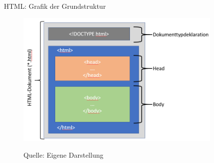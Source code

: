 \documentclass[xcolor=dvipsnames]{beamer}\usepackage[]{graphicx}\usepackage[]{color}
\begin{document}
\begin{frame}{HTML: Grafik der Grundstruktur }
  \begin{figure}
  	\centering
  	\includegraphics[width=0.9\textwidth]{figure/htmlbasicstructure.png}
  	{\footnotesize \tiny Quelle: Eigene Darstellung \par}
  \end{figure}
\end{frame}
\end{document}
